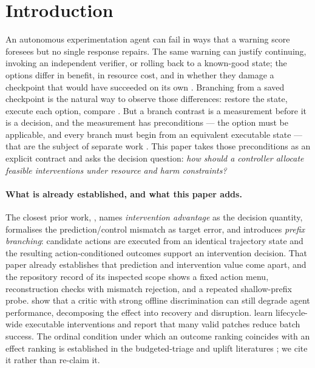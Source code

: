 \section{Introduction}
\label{sec:b-introduction}

An autonomous experimentation agent can fail in ways that a warning score
foresees but no single response repairs.  The same warning can justify
continuing, invoking an independent verifier, or rolling back to a known-good
state; the options differ in benefit, in resource cost, and in whether they
damage a checkpoint that would have succeeded on its own
\citep{interventionparadox2026,harnessr12026}.  Branching from a saved
checkpoint is the natural way to observe those differences: restore the state,
execute each option, compare \citep{calibrationnotcontrol2026,causalagentreplay2026,replaygap2026}.
But a branch contrast is a measurement before it is a decision, and the
measurement has preconditions --- the option must be applicable, and every
branch must begin from an equivalent executable state --- that are the subject
of separate work \citep{zhang2026ca}.  This paper takes those preconditions as
an explicit contract and asks the decision question: \emph{how should a
controller allocate feasible interventions under resource and harm
constraints?}

\paragraph{What is already established, and what this paper adds.}
The closest prior work, \citet{calibrationnotcontrol2026}, names
\emph{intervention advantage} as the decision quantity, formalises the
prediction/control mismatch as target error, and introduces \emph{prefix
branching}: candidate actions are executed from an identical trajectory state
and the resulting action-conditioned outcomes support an intervention decision.
That paper already establishes that prediction and intervention value come
apart, and the repository record of its inspected scope shows a fixed action
menu, reconstruction checks with mismatch rejection, and a repeated
shallow-prefix probe.  \citet{interventionparadox2026} show that a critic with
strong offline discrimination can still degrade agent performance, decomposing
the effect into recovery and disruption.  \citet{harnessr12026} learn
lifecycle-wide executable interventions and report that many valid patches
reduce batch success.  The ordinal condition under which an outcome ranking
coincides with an effect ranking is established in the budgeted-triage and
uplift literatures \citep{okati2021,fernandezloria2022,kamran2024}; we cite it
rather than re-claim it.


